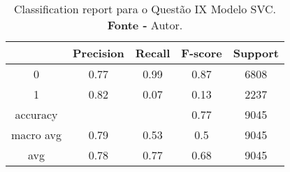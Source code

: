 % 
\begin{table}[H]
    \centering
    \begin{tabular}{@{}ccccc@{}}
    \toprule
     & \textbf{Precision} & \textbf{Recall} &\textbf{F-score} & \textbf{Support} \\ \midrule 
    0 & 0.77 & 0.99 & 0.87 & 6808 \\ 
    1 & 0.82 & 0.07 & 0.13 & 2237 \\ 
    accuracy &  &  & 0.77 & 9045 \\ 
    macro avg & 0.79 & 0.53 & 0.5 & 9045 \\ 
    avg & 0.78 & 0.77 & 0.68 & 9045 \\ \bottomrule 
    \end{tabular}
    \caption{Classification report para o Questão IX Modelo SVC. \\ \textbf{Fonte -} Autor.}
    \label{tab: classification-report-Questão IX Modelo SVC}
\end{table}